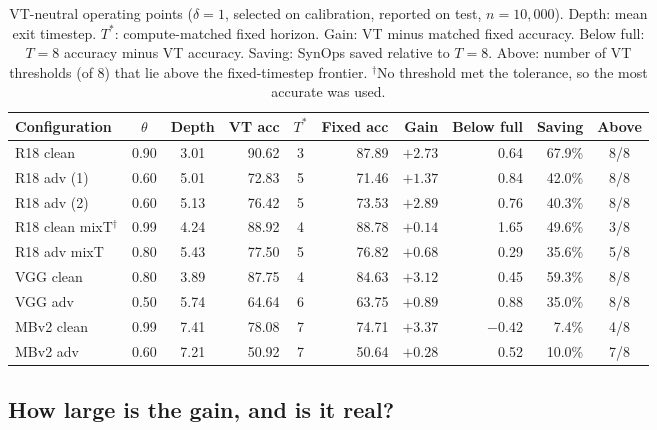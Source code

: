 \begin{table}[htbp]
    \centering
    \caption[VT-neutral operating points]{VT-neutral operating points ($\delta = 1$, selected on calibration, reported on test, $n = 10{,}000$). Depth: mean exit timestep. $T^*$: compute-matched fixed horizon. Gain: VT minus matched fixed accuracy. Below full: $T=8$ accuracy minus VT accuracy. Saving: SynOps saved relative to $T = 8$. Above: number of VT thresholds (of 8) that lie above the fixed-timestep frontier. $^\dagger$No threshold met the tolerance, so the most accurate was used.}
    \label{tab:res-neutral}
    \small
    \setlength{\tabcolsep}{4pt}
    \begin{tabular}{@{}l c c r c r r r r c@{}}
        \toprule
        Configuration & $\theta$ & Depth & VT acc & $T^*$ & Fixed acc & Gain & Below full & Saving & Above \\
        \midrule
        R18 clean                 & 0.90 & 3.01 & 90.62 & 3 & 87.89 & $+2.73$ & 0.64 & 67.9\% & 8/8 \\
        R18 adv (1)               & 0.60 & 5.01 & 72.83 & 5 & 71.46 & $+1.37$ & 0.84 & 42.0\% & 8/8 \\
        R18 adv (2)               & 0.60 & 5.13 & 76.42 & 5 & 73.53 & $+2.89$ & 0.76 & 40.3\% & 8/8 \\
        R18 clean mixT$^\dagger$  & 0.99 & 4.24 & 88.92 & 4 & 88.78 & $+0.14$ & 1.65 & 49.6\% & 3/8 \\
        R18 adv mixT              & 0.80 & 5.43 & 77.50 & 5 & 76.82 & $+0.68$ & 0.29 & 35.6\% & 5/8 \\
        VGG clean                 & 0.80 & 3.89 & 87.75 & 4 & 84.63 & $+3.12$ & 0.45 & 59.3\% & 8/8 \\
        VGG adv                   & 0.50 & 5.74 & 64.64 & 6 & 63.75 & $+0.89$ & 0.88 & 35.0\% & 8/8 \\
        MBv2 clean                & 0.99 & 7.41 & 78.08 & 7 & 74.71 & $+3.37$ & $-0.42$ & 7.4\% & 4/8 \\
        MBv2 adv                  & 0.60 & 7.21 & 50.92 & 7 & 50.64 & $+0.28$ & 0.52 & 10.0\% & 7/8 \\
        \bottomrule
    \end{tabular}
\end{table}

\subsection{How large is the gain, and is it real?}


